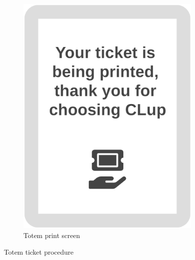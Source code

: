 \begin{figure}[h!]
\begin{subfigure}[b]{0.3\textwidth}
		\includegraphics[width=\linewidth]{../Diagrams/WireframesCLup/TotemPrint.png}
		\caption{Totem print screen}
		\label{fig:WfTotemPrint}
	\end{subfigure}
	\caption{Totem ticket procedure}
	\label{fig:WireframesTotem}
\end{figure}
\pagebreak
